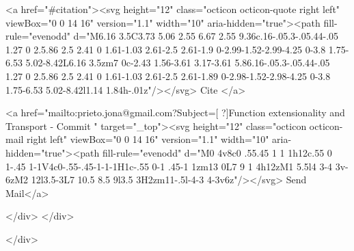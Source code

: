       <a  href="#citation"><svg height="12" class="octicon octicon-quote right left" viewBox="0 0 14 16" version="1.1" width="10" aria-hidden="true"><path fill-rule="evenodd" d="M6.16 3.5C3.73 5.06 2.55 6.67 2.55 9.36c.16-.05.3-.05.44-.05 1.27 0 2.5.86 2.5 2.41 0 1.61-1.03 2.61-2.5 2.61-1.9 0-2.99-1.52-2.99-4.25 0-3.8 1.75-6.53 5.02-8.42L6.16 3.5zm7 0c-2.43 1.56-3.61 3.17-3.61 5.86.16-.05.3-.05.44-.05 1.27 0 2.5.86 2.5 2.41 0 1.61-1.03 2.61-2.5 2.61-1.89 0-2.98-1.52-2.98-4.25 0-3.8 1.75-6.53 5.02-8.42l1.14 1.84h-.01z"/></svg> Cite
      </a>

      <a href="mailto:prieto.jona@gmail.com?Subject=[ ?]Function extensionality and Transport - Commit " target="_top"><svg height="12" class="octicon octicon-mail right left" viewBox="0 0 14 16" version="1.1" width="10" aria-hidden="true"><path fill-rule="evenodd" d="M0 4v8c0 .55.45 1 1 1h12c.55 0 1-.45 1-1V4c0-.55-.45-1-1-1H1c-.55 0-1 .45-1 1zm13 0L7 9 1 4h12zM1 5.5l4 3-4 3v-6zM2 12l3.5-3L7 10.5 8.5 9l3.5 3H2zm11-.5l-4-3 4-3v6z"/></svg> Send Mail</a>

    </div>
  </div>

</div>




